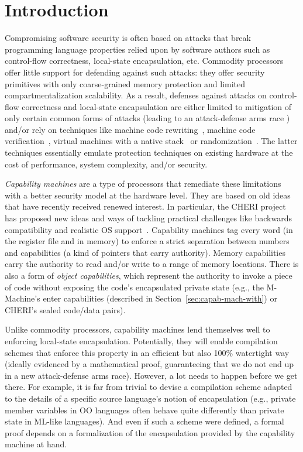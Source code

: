 \documentclass[format=acmsmall, review=true, screen=true]{acmart}
\begin{document}
\section{Introduction}
\label{sec:introduction}

Compromising software security is often based on attacks that break programming language properties relied upon by software authors such as control-flow correctness, local-state encapsulation, etc.
Commodity processors offer little support for defending against such attacks: they offer security primitives with only coarse-grained memory protection and limited compartmentalization scalability.
As a result, defenses against attacks on control-flow correctness and local-state encapsulation are either limited to mitigation of only certain common forms of attacks (leading to an attack-defense arms race \citep{Szekeres_sok_2013}) and/or rely on techniques like machine code rewriting~\citep{wahbe_efficient_1993,abadi_control-flow_2005}, machine code verification~\citep{morrisett_system_1999}, virtual machines with a native stack~\citep{lindholm_java_2014} or randomization~\citep{forrest_building_1997}.
The latter techniques essentially emulate protection techniques on existing hardware at the cost of performance, system complexity, and/or security.

\emph{Capability machines} are a type of processors that remediate these limitations with a better security model at the hardware level.
They are based on old ideas~\citep{Carter:1994:HSF:195473.195579,Dennis:1966:PSM:365230.365252,shapiro_eros:_1999} that have recently received renewed interest.
In particular, the CHERI project has proposed new ideas and ways of tackling practical challenges like backwards compatibility and realistic OS support~\citep{Watson2015Cheri,Woodruff:2014:CCM:2665671.2665740}.
Capability machines tag every word (in the register file and in memory) to enforce a strict separation between numbers and capabilities (a kind of pointers that carry authority).
Memory capabilities carry the authority to read and/or write to a range of memory locations.
There is also a form of \emph{object capabilities}, which represent the authority to invoke a piece of code without exposing the code's encapsulated private state (e.g., the M-Machine's enter capabilities (described in Section~\ref{sec:capab-mach-with}) or CHERI's sealed code/data pairs).

Unlike commodity processors, capability machines lend themselves well to
enforcing local-state encapsulation. Potentially, they will enable compilation
schemes that enforce this property in an efficient but also 100\% watertight way
(ideally evidenced by a mathematical proof, guaranteeing that we do not end up
in a new attack-defense arms race). However, a lot needs to happen before we get
there. For example, it is far from trivial to devise a compilation scheme
adapted to the details of a specific source language's notion of encapsulation
(e.g., private member variables in OO languages often behave quite differently
than private state in ML-like languages). And even if such a scheme were
defined, a formal proof depends on a formalization of the encapsulation provided
by the capability machine at hand.
\end{document}

